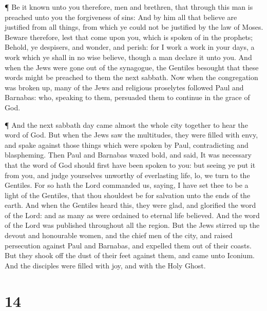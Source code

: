  ¶ Be it known unto you therefore, men and brethren, that
through this man is preached unto you the forgiveness of sins:
 And by him all that believe are justified from all things,
from which ye could not be justified by the law of Moses. 
Beware therefore, lest that come upon you, which is spoken of in the
prophets;  Behold, ye despisers, and wonder, and perish:
for I work a work in your days, a work which ye shall in no wise
believe, though a man declare it unto you.  And when the
Jews were gone out of the synagogue, the Gentiles besought that these
words might be preached to them the next sabbath.  Now when
the congregation was broken up, many of the Jews and religious
proselytes followed Paul and Barnabas: who, speaking to them, persuaded
them to continue in the grace of God.

 ¶ And the next sabbath day came almost the whole city
together to hear the word of God.  But when the Jews saw
the multitudes, they were filled with envy, and spake against those
things which were spoken by Paul, contradicting and blaspheming.
 Then Paul and Barnabas waxed bold, and said, It was
necessary that the word of God should first have been spoken to you: but
seeing ye put it from you, and judge yourselves unworthy of everlasting
life, lo, we turn to the Gentiles.  For so hath the Lord
commanded us, saying, I have set thee to be a light of the Gentiles,
that thou shouldest be for salvation unto the ends of the earth.
 And when the Gentiles heard this, they were glad, and
glorified the word of the Lord: and as many as were ordained to eternal
life believed.  And the word of the Lord was published
throughout all the region.  But the Jews stirred up the
devout and honourable women, and the chief men of the city, and raised
persecution against Paul and Barnabas, and expelled them out of their
coasts.  But they shook off the dust of their feet against
them, and came unto Iconium.  And the disciples were filled
with joy, and with the Holy Ghost.

\hypertarget{section-13}{%
\section{14}\label{section-13}}

